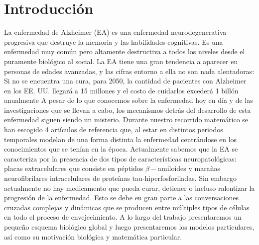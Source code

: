 \documentclass[1p]{elsarticle}
\begin{document}
\section{Introducción}
La enfermedad de Alzheimer (EA) es una enfermedad neurodegenerativa progresiva que destruye la memoria y las habilidades cognitivas. Es una enfermedad muy común pero altamente destructiva a todos los niveles desde el puramente biológico al social. La EA tiene una gran tendencia a aparecer en personas de edades avanzadas, y las cifras entorno a ella no son nada alentadoras: Si no se encuentra una cura, para 2050, la cantidad de pacientes con Alzheimer
en los EE. UU. llegará a 15 millones y el costo de cuidarlos excederá  1 billón anualmente \cite{hao}
A pesar de lo que conocemos sobre la enfermedad hoy en día y de las investigaciones que se llevan a cabo, los mecanismos detrás del desarrollo de esta enfermedad siguen siendo un misterio.
Durante nuestro recorrido matemático se han escogido 4 artículos de referencia que, al estar en distintos periodos temporales modelan de una forma distinta la enfermedad centrándose en los conocimientos que se tenían en la época. Actualmente sabemos que la EA se caracteriza por la presencia de dos tipos de características neuropatológicas: placas extracelulares
que consiste en péptidos $\beta-$amiloides y marañas neurofibrilares intracelulares de proteínas tau-hiperfosforiladas.
Sin embargo actualmente no hay medicamento que pueda
curar, detiener o incluso ralentizar la progresión de la enfermedad. Esto se debe en gran parte a las conversaciones cruzadas complejas y dinámicas que se producen entre múltiples tipos de células en todo el proceso de envejecimiento.
A lo largo del trabajo presentaremos un pequeño esquema biológico global y luego presentaremos los modelos particulares, así como su motivación biológica y matemática particular.
\end{document}
